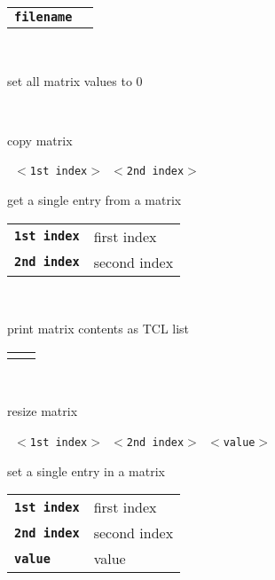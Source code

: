 \begin{description}
\begin{description}
      \begin{tabular}{ll}
 \texttt{\textbf{filename}} &    \\
      \end{tabular}
       \texttt{} \

        set all matrix values to 0

       \texttt{} \

        copy matrix

       \texttt{ $<$1st index$>$ $<$2nd index$>$} \

        get a single entry from a matrix

      \begin{tabular}{ll}
 \texttt{\textbf{1st index}} &  first index  \\
 \texttt{\textbf{2nd index}} &  second index  \\
      \end{tabular}
       \texttt{ } \

        print matrix contents as TCL list

      \begin{tabular}{ll}
 \texttt{\textbf{}} &  \\
      \end{tabular}
       \texttt{} \

        resize matrix

       \texttt{ $<$1st index$>$ $<$2nd index$>$ $<$value$>$} \

        set a single entry in a matrix

      \begin{tabular}{ll}
 \texttt{\textbf{1st index}} &  first index  \\
 \texttt{\textbf{2nd index}} &  second index  \\
 \texttt{\textbf{value}} &      value  \\
      \end{tabular}
    \end{description}

\end{description}

